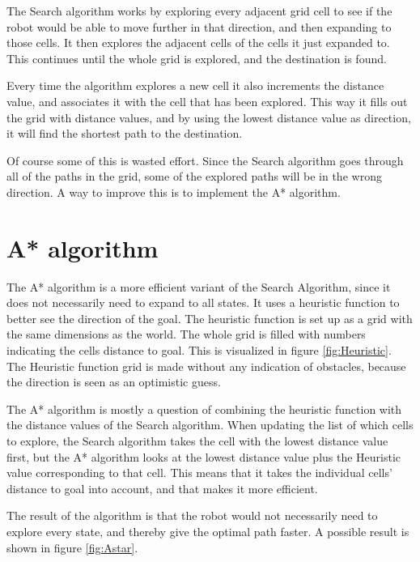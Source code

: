 The Search algorithm works by exploring every adjacent grid cell to see if the robot would be able to move further in that direction, and then expanding to those cells. It then explores the adjacent cells of the cells it just expanded to. This continues until the whole grid is explored, and the destination is found. 

Every time the algorithm explores a new cell it also increments the distance value, and associates it with the cell that has been explored. This way it fills out the grid with distance values, and by using the lowest distance value as direction, it will find the shortest path to the destination. 


Of course some of this is wasted effort. Since the Search algorithm goes through all of the paths in the grid, some of the explored paths will be in the wrong direction. A way to improve this is to implement the A* algorithm.  

\section{A* algorithm}
The A* algorithm is a more efficient variant of the Search Algorithm, since it does not necessarily need to expand to all states. It uses a heuristic function to better see the direction of the goal. The heuristic function is set up as a grid with the same dimensions as the world. The whole grid is filled with numbers indicating the cells distance to goal. This is visualized in figure \ref{fig:Heuristic}. The Heuristic function grid is made without any indication of obstacles, because the direction is seen as an optimistic guess.

The A* algorithm is mostly a question of combining the heuristic function with the distance values of the Search algorithm. When updating the list of which cells to explore, the Search algorithm takes the cell with the lowest distance value first, but the A* algorithm looks at the lowest distance value plus the Heuristic value corresponding to that cell. This means that it takes the individual cells' distance to goal into account, and that makes it more efficient. 

The result of the algorithm is that the robot would not necessarily need to explore every state, and thereby give the optimal path faster. A possible result is shown in figure \ref{fig:Astar}.


